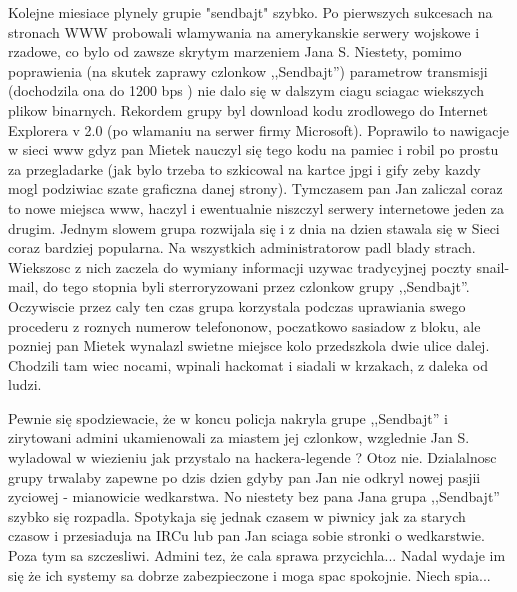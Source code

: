 \documentclass[a4paper,polish,titlepage,12pt]{article}
\begin{document}
Kolejne miesiace plynely grupie "sendbajt" szybko. Po pierwszych sukcesach na stronach WWW probowali wlamywania na amerykanskie serwery wojskowe i rzadowe, co bylo od zawsze skrytym marzeniem Jana S. Niestety, pomimo poprawienia (na skutek zaprawy czlonkow ,,Sendbajt'') parametrow transmisji (dochodzila ona do 1200 bps ) nie dalo się w dalszym ciagu sciagac wiekszych plikow binarnych. Rekordem grupy byl download kodu zrodlowego do Internet Explorera v 2.0 (po wlamaniu na serwer firmy Microsoft). Poprawilo to nawigacje w sieci www gdyz pan Mietek nauczyl się tego kodu na pamiec i robil po prostu za przegladarke (jak bylo trzeba to szkicowal na kartce jpgi i gify zeby kazdy mogl podziwiac szate graficzna danej strony). Tymczasem pan Jan zaliczal coraz to nowe miejsca www, haczyl i ewentualnie niszczyl serwery internetowe jeden za drugim. Jednym slowem grupa rozwijala się i z dnia na dzien stawala się w Sieci coraz bardziej popularna. Na wszystkich administratorow padl blady strach. Wiekszosc z nich zaczela do wymiany informacji uzywac tradycyjnej poczty snail-mail, do tego stopnia byli sterroryzowani przez czlonkow grupy ,,Sendbajt''. Oczywiscie przez caly ten czas grupa korzystala podczas uprawiania swego procederu z roznych numerow telefononow, poczatkowo sasiadow z bloku, ale pozniej pan Mietek wynalazl swietne miejsce kolo przedszkola dwie ulice dalej. Chodzili tam wiec nocami, wpinali hackomat i siadali w krzakach, z daleka od ludzi.

Pewnie się spodziewacie, że w koncu policja nakryla grupe ,,Sendbajt'' i zirytowani admini ukamienowali za miastem jej czlonkow, wzglednie Jan S. wyladowal w wiezieniu jak przystalo na hackera-legende ? Otoz nie. Dzialalnosc grupy trwalaby zapewne po dzis dzien gdyby pan Jan nie odkryl nowej pasjii zyciowej - mianowicie wedkarstwa. No niestety bez pana Jana grupa ,,Sendbajt'' szybko się rozpadla. Spotykaja się jednak czasem w piwnicy jak za starych czasow i przesiaduja na IRCu lub pan Jan sciaga sobie stronki o wedkarstwie. Poza tym sa szczesliwi. Admini tez, że cala sprawa przycichla... Nadal wydaje im się że ich systemy sa dobrze zabezpieczone i moga spac spokojnie. Niech spia... 
\end{document}
